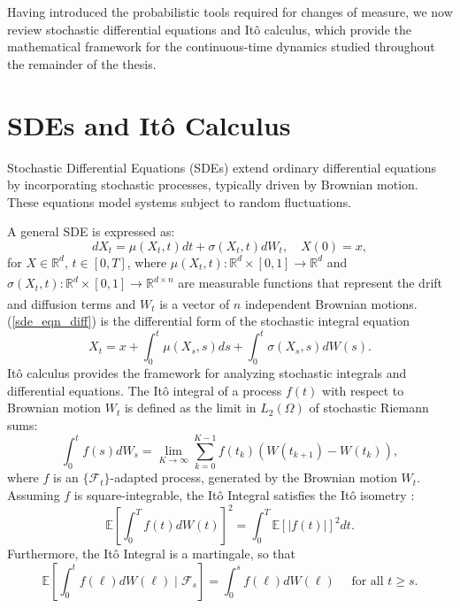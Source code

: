 \documentclass[11pt, twoside]{report}
\begin{document}
Having introduced the probabilistic tools required for changes of measure,
we now review stochastic differential equations and It\^{o} calculus, which
provide the mathematical framework for the continuous-time dynamics studied
throughout the remainder of the thesis.


\section{SDEs and It\^{o} Calculus}
Stochastic Differential Equations (SDEs) extend ordinary differential equations by incorporating stochastic processes, typically driven by Brownian motion. These equations model systems subject to random fluctuations.

A general SDE is expressed as:
\begin{equation} \label{sde_eqn_diff}
    dX_t = \mu(X_t, t) dt + \sigma(X_t, t) dW_t, \quad X(0) = x,
\end{equation}
for $X \in \mathbb{R}^d$, $t \in [0,T]$, where $\mu(X_t, t): \mathbb{R}^d \times [0,1] \xrightarrow[]{} \mathbb{R}^d$ and $\sigma(X_t, t): \mathbb{R}^d \times [0,1] \xrightarrow[]{} \mathbb{R}^{d \times n}$ are measurable functions that represent the drift and diffusion terms and $W_t$ is a vector of $n$ independent Brownian motions. (\ref{sde_eqn_diff}) is the differential form of the stochastic integral equation
\begin{equation} \label{sde_eqn_int}
    X_t = x + \int_0^t \mu(X_s, s) ds + \int_0^t\sigma(X_s, s) dW(s).
\end{equation}
It\^{o} calculus provides the framework for analyzing stochastic integrals and differential equations. The It\^{o} integral of a process $f(t)$ with respect to Brownian motion $W_t$ is defined as the limit in $L_2(\Omega)$ of stochastic Riemann sums:
\begin{equation} \label{ito_int}
    \int_0^t f(s) dW_s = \lim_{K \xrightarrow[]{} \infty} \sum_{k=0}^{K-1} f(t_k) (W(t_{k+1}) - W(t_k)),
\end{equation}
where $f$ is an $\{\mathcal{F}_t\}$-adapted process, generated by the Brownian motion $W_t$. Assuming $f$ is square-integrable, the It\^{o} Integral satisfies the It\^{o} isometry \cite{pavliotis_book}:
\begin{equation} \label{ito_isometry}
    \mathbb{E} \left[ \int_0^T f(t) dW(t)\right]^2 = \int_0^T \mathbb{E}\left[|f(t)|\right]^2 dt.
\end{equation}
Furthermore, the It\^{o} Integral is a martingale, so that 
\begin{equation} \label{ito_martin}
\mathbb{E}\left[\int_0^t f(\ell) d W(\ell) \mid \mathcal{F}_s\right]=\int_0^s f(\ell) d W(\ell) \quad \text{ for all } t \geqslant s.
\end{equation}
\end{document}

